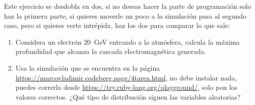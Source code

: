 \documentclass[./../main.tex]{subfiles}
\begin{document}
	\begin{exercise}
		Este ejercicio se desdobla en dos, si no deseas hacer la parte de programación solo haz la primera parte, si quieres moverle un poco a la simulación pasa al segundo caso, pero si quieres verte intrépidx, haz los dos para comparar lo que sale:

		\begin{enumerate}
			\item Considera un electrón \SI{20}{\GeV} entrando a la atmósfera, calcula la máxima profundidad que alcanza la cascada electromagnética generada.
			\item Usa la simulación que se encuentra en la página \url{https://marcovladimir.codeberg.page/4tarea.html}, no debe instalar nada, puedes correrla desde \url{https://try.ruby-lang.org/playground/}, solo pon los valores correctos. ¿Qué tipo de distribución siguen las variables aleatorias?
		\end{enumerate}
	\end{exercise}
\end{document}
